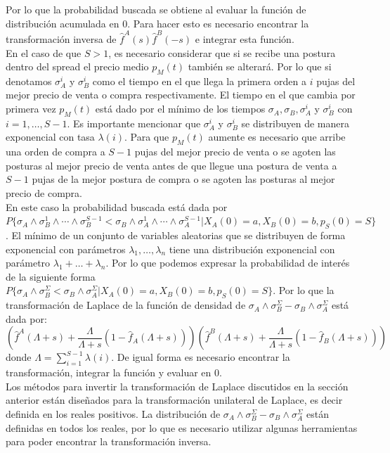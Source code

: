 \documentclass[11pt]{article}
\numberwithin{equation}{section} %
\begin{document}
Por lo que la probabilidad buscada se obtiene al evaluar la función de distribución acumulada en 0. Para hacer esto es necesario encontrar la transformación inversa de $\hat{f}^A(s)\hat{f}^B(-s)$ e integrar esta función.\\

En el caso de que $S>1$, es necesario considerar que si se recibe una postura dentro del spread el precio medio $p_M(t)$ también se alterará. Por lo que si denotamos $\sigma_A^i$ y $\sigma_B^i$ como el tiempo en el que llega la primera orden a $i$ pujas del mejor precio de venta o compra respectivamente. El tiempo en el que cambia por primera vez $p_M(t)$ está dado por el mínimo de los tiempos $\sigma_A,\sigma_B,\sigma_A^i$ y $\sigma_B^i$ con $i=1,\ldots,S-1$. Es importante mencionar que $\sigma_A^i$ y $\sigma_B^i$ se distribuyen de manera exponencial con tasa $\lambda(i)$. Para que $p_M(t)$ aumente es necesario que arribe una orden de compra a $S-1$ pujas del mejor precio de venta o se agoten las posturas al mejor precio de venta antes de que llegue una postura de venta a $S-1$ pujas de la mejor postura de compra o se agoten las posturas al mejor precio de compra.\\

En este caso la probabilidad buscada está dada por $P\{\sigma_A \land \sigma_B^1 \land \cdots \land \sigma_B^{S-1} < \sigma_B \land \sigma_A^1 \land \cdots \land \sigma_A^{S-1}|X_A(0)=a,X_B(0)=b,p_S(0)=S\}$. El mínimo de un conjunto de variables aleatorias que se distribuyen de forma exponencial con parámetros $\lambda_1,\ldots,\lambda_n$ tiene una distribución exponencial con parámetro $\lambda_1+\ldots+\lambda_n$. Por lo que podemos expresar la probabilidad de interés de la siguiente forma $P\{\sigma_A \land \sigma_B^\Sigma < \sigma_B \land \sigma_A^\Sigma|X_A(0)=a,X_B(0)=b,p_S(0)=S\}$. Por lo que la transformación de Laplace de la función de densidad de $\sigma_A \land \sigma_B^\Sigma - \sigma_B \land \sigma_A^\Sigma$ está dada por:
\[
\left(\hat{f}^A(\Lambda+s)+\frac{\Lambda}{\Lambda+s}(1-\hat{f}_A(\Lambda+s))\right)
\left(\hat{f}^B(\Lambda+s)+\frac{\Lambda}{\Lambda+s}(1-\hat{f}_B(\Lambda+s))\right)
\]
donde $\Lambda=\sum_{i=1}^{S-1}\lambda(i)$. De igual forma es necesario encontrar la transformación, integrar la función y evaluar en 0.\\

Los métodos para invertir la transformación de Laplace discutidos en la sección anterior están diseñados para la transformación unilateral de Laplace, es decir definida en los reales positivos. La distribución de  $\sigma_A \land \sigma_B^\Sigma - \sigma_B \land \sigma_A^\Sigma$ están definidas en todos los reales, por lo que es necesario utilizar algunas herramientas para poder encontrar la transformación inversa.\\
\end{document}
